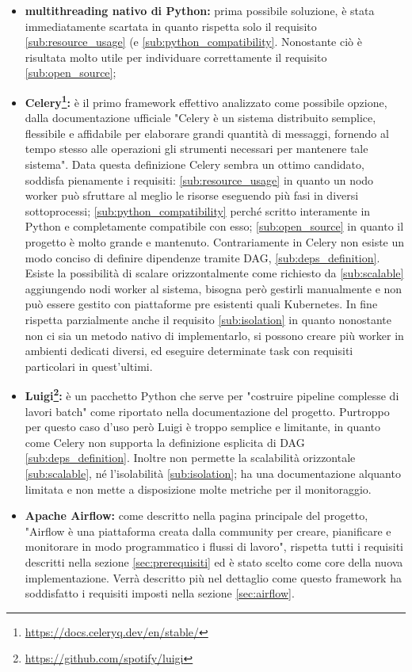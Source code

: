 \begin{itemize}
  \item \textbf{multithreading nativo di Python:} prima possibile soluzione, è stata
    immediatamente scartata in quanto rispetta solo il requisito \ref{sub:resource_usage}
    (e \ref{sub:python_compatibility}. Nonostante ciò è risultata molto utile per
    individuare correttamente il requisito \ref{sub:open_source};

  \item \textbf{Celery\footnote{\url{https://docs.celeryq.dev/en/stable/}}:} è
    il primo framework effettivo analizzato come possibile opzione, dalla documentazione
    ufficiale "Celery è un sistema distribuito semplice, flessibile e affidabile
    per elaborare grandi quantità di messaggi, fornendo al tempo stesso alle
    operazioni gli strumenti necessari per mantenere tale sistema". Data questa
    definizione Celery sembra un ottimo candidato, soddisfa pienamente i requisiti:
    \ref{sub:resource_usage} in quanto un nodo worker può sfruttare al meglio le
    risorse eseguendo più fasi in diversi sottoprocessi; \ref{sub:python_compatibility}
    perché scritto interamente in Python e completamente compatibile con esso;
    \ref{sub:open_source} in quanto il progetto è molto grande e mantenuto. Contrariamente
    in Celery non esiste un modo conciso di definire dipendenze tramite DAG,
    \ref{sub:deps_definition}. Esiste la possibilità di scalare orizzontalmente come
    richiesto da \ref{sub:scalable} aggiungendo nodi worker al sistema, bisogna
    però gestirli manualmente e non può essere gestito con piattaforme pre
    esistenti quali Kubernetes. In fine rispetta parzialmente anche il requisito
    \ref{sub:isolation} in quanto nonostante non ci sia un metodo nativo di implementarlo,
    si possono creare più worker in ambienti dedicati diversi, ed eseguire determinate
    task con requisiti particolari in quest'ultimi.

  \item \textbf{Luigi\footnote{\url{https://github.com/spotify/luigi}}:} è un
    pacchetto Python che serve per "costruire pipeline complesse di lavori batch"
    come riportato nella documentazione del progetto. Purtroppo per questo caso d'uso
    però Luigi è troppo semplice e limitante, in quanto come Celery non supporta
    la definizione esplicita di DAG \ref{sub:deps_definition}. Inoltre non permette
    la scalabilità orizzontale \ref{sub:scalable}, né l'isolabilità
    \ref{sub:isolation}; ha una documentazione alquanto limitata e non mette a disposizione
    molte metriche per il monitoraggio.

  \item \textbf{Apache Airflow\cite{airflow}:} come descritto nella pagina
    principale del progetto, "Airflow è una piattaforma creata dalla community
    per creare, pianificare e monitorare in modo programmatico i flussi di lavoro",
    rispetta tutti i requisiti descritti nella sezione \ref{sec:prerequisiti} ed
    è stato scelto come core della nuova implementazione. Verrà descritto più
    nel dettaglio come questo framework ha soddisfatto i requisiti imposti nella
    sezione \ref{sec:airflow}.
\end{itemize}

